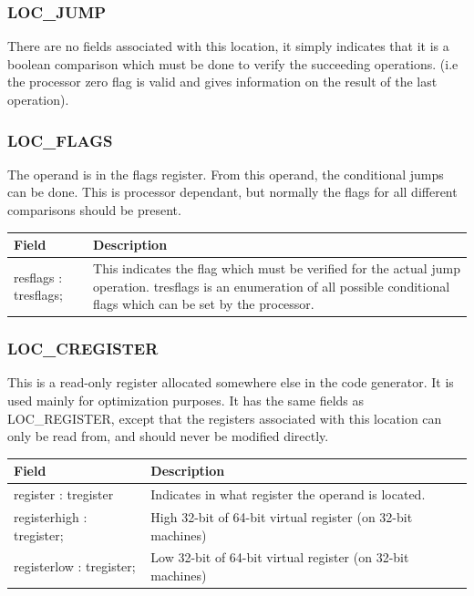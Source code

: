 \documentclass [a4paper,12pt]{article}
\begin{document}
\subsubsection{LOC{\_}JUMP}
\label{subsubsec:mylabel22}

There are no fields associated with this location, it simply indicates that
it is a boolean comparison which must be done to verify the succeeding
operations. (i.e the processor zero flag is valid and gives information on
the result of the last operation).

\subsubsection{LOC{\_}FLAGS}
\label{subsubsec:mylabel23}

The operand is in the flags register. From this operand, the conditional
jumps can be done. This is processor dependant, but normally the flags for
all different comparisons should be present.

\begin{longtable}{|l|p{10cm}|}
\hline
Field   & Description \\
\hline
\endhead
\hline
\endfoot
\textsf{resflags : tresflags;}&
    This indicates the flag which must be verified for the actual jump
    operation. \textsf{tresflags }is an enumeration of all possible
    conditional flags which can be set by the processor. \\
\end{longtable}

\subsubsection{LOC{\_}CREGISTER}
\label{subsubsec:mylabel24}

This is a read-only register allocated somewhere else in the code generator.
It is used mainly for optimization purposes. It has the same fields as
LOC{\_}REGISTER, except that the registers associated with this location can
only be read from, and should never be modified directly.

\begin{longtable}{|l|p{10cm}|}
\hline
Field   & Description \\
\hline
\endhead
\hline
\endfoot
\textsf{register : tregister}&
    Indicates in what register the operand is located. \\
\textsf{registerhigh : tregister;}&
    High 32-bit of 64-bit virtual register (on 32-bit machines) \\
\textsf{registerlow : tregister;}&
    Low 32-bit of 64-bit virtual register (on 32-bit machines) \\
\end{longtable}
\end{document}

